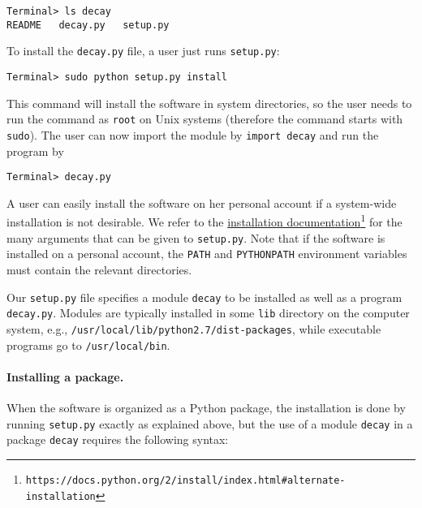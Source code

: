 \documentclass[graybox,sectrefs,envcountresetchap,open=right,final]{svmonodo}
\begin{document}
\begin{Verbatim}[frame=lines,label=\fbox{{\tiny Terminal}},framesep=2.5mm,framerule=0.7pt,fontsize=\fontsize{9pt}{9pt}]
Terminal> ls decay
README   decay.py   setup.py

\end{Verbatim}

To install the \texttt{decay.py} file, a user
just runs \texttt{setup.py}:



\begin{Verbatim}[frame=lines,label=\fbox{{\tiny Terminal}},framesep=2.5mm,framerule=0.7pt,fontsize=\fontsize{9pt}{9pt}]
Terminal> sudo python setup.py install

\end{Verbatim}

This command will install the software in system directories, so the user
needs to run the command as \texttt{root} on Unix systems (therefore the command
starts with \texttt{sudo}).
The user can now import the module by \texttt{import decay} and run
the program by



\begin{Verbatim}[frame=lines,label=\fbox{{\tiny Terminal}},framesep=2.5mm,framerule=0.7pt,fontsize=\fontsize{9pt}{9pt}]
Terminal> decay.py

\end{Verbatim}


A user can easily install the software on her personal account if
a system-wide installation is not desirable. We refer to the
\href{{https://docs.python.org/2/install/index.html#alternate-installation}}{installation documentation}\footnote{\texttt{https://docs.python.org/2/install/index.html\#alternate-installation}} for the many arguments that can be given to \texttt{setup.py}.
Note that if the software is installed on a personal account, the
\texttt{PATH} and \texttt{PYTHONPATH} environment variables must contain the
relevant directories.

Our \texttt{setup.py} file specifies a module \texttt{decay} to be installed as well
as a program \texttt{decay.py}.  Modules are typically installed in some \texttt{lib}
directory on the computer system, e.g.,
\texttt{/usr/local/lib/python2.7/dist-packages}, while executable programs go
to \texttt{/usr/local/bin}.


\paragraph{Installing a package.}
When the software is organized as a Python package, the installation is
done by running \texttt{setup.py} exactly as explained above, but the use of a module
\texttt{decay} in a package \texttt{decay} requires the following syntax:
\end{document}
